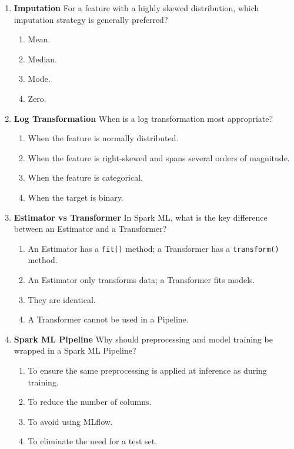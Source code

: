 \documentclass{article}
\begin{document}
\begin{enumerate}[label=\textbf{Q\arabic*.}]
		\item \textbf{Imputation}
		For a feature with a highly skewed distribution, which imputation strategy is generally preferred?
		\begin{enumerate}[label=\Alph*.]
			\item Mean.
			\item Median.
			\item Mode.
			\item Zero.
		\end{enumerate}
		
		\item \textbf{Log Transformation}
		When is a log transformation most appropriate?
		\begin{enumerate}[label=\Alph*.]
			\item When the feature is normally distributed.
			\item When the feature is right-skewed and spans several orders of magnitude.
			\item When the feature is categorical.
			\item When the target is binary.
		\end{enumerate}
		
		\item \textbf{Estimator vs Transformer}
		In Spark ML, what is the key difference between an Estimator and a Transformer?
		\begin{enumerate}[label=\Alph*.]
			\item An Estimator has a \texttt{fit()} method; a Transformer has a \texttt{transform()} method.
			\item An Estimator only transforms data; a Transformer fits models.
			\item They are identical.
			\item A Transformer cannot be used in a Pipeline.
		\end{enumerate}
		
		\item \textbf{Spark ML Pipeline}
		Why should preprocessing and model training be wrapped in a Spark ML Pipeline?
		\begin{enumerate}[label=\Alph*.]
			\item To ensure the same preprocessing is applied at inference as during training.
			\item To reduce the number of columns.
			\item To avoid using MLflow.
			\item To eliminate the need for a test set.
		\end{enumerate}
		

\end{enumerate}
\end{document}
